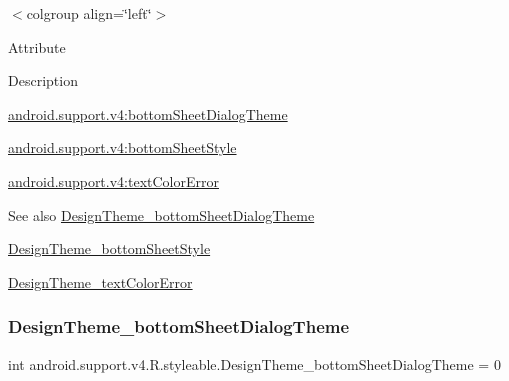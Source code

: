 \tabulinesep=1mm
\begin{longtabu} spread 0pt [c]{*{0}{|X[-1]}|}
\hline
\end{longtabu}
$<$colgroup align=\char`\"{}left\char`\"{}$>$ 

Attribute

Description 

{\ttfamily \hyperlink{classandroid_1_1support_1_1v4_1_1R_1_1styleable_a751b8940b6227f89ce627bab7a4782e0}{android.\+support.\+v4\+:bottom\+Sheet\+Dialog\+Theme}}

{\ttfamily \hyperlink{classandroid_1_1support_1_1v4_1_1R_1_1styleable_af97dd7c6ce7914e917496c10a232ef71}{android.\+support.\+v4\+:bottom\+Sheet\+Style}}

{\ttfamily \hyperlink{classandroid_1_1support_1_1v4_1_1R_1_1styleable_a6fcc0cb0fae8a6fc95519de5b4299973}{android.\+support.\+v4\+:text\+Color\+Error}}

\begin{DoxySeeAlso}{See also}
\hyperlink{classandroid_1_1support_1_1v4_1_1R_1_1styleable_a751b8940b6227f89ce627bab7a4782e0}{Design\+Theme\+\_\+bottom\+Sheet\+Dialog\+Theme} 

\hyperlink{classandroid_1_1support_1_1v4_1_1R_1_1styleable_af97dd7c6ce7914e917496c10a232ef71}{Design\+Theme\+\_\+bottom\+Sheet\+Style} 

\hyperlink{classandroid_1_1support_1_1v4_1_1R_1_1styleable_a6fcc0cb0fae8a6fc95519de5b4299973}{Design\+Theme\+\_\+text\+Color\+Error} 
\end{DoxySeeAlso}
\mbox{\label{classandroid_1_1support_1_1v4_1_1R_1_1styleable_a751b8940b6227f89ce627bab7a4782e0}} 
\subsubsection{\texorpdfstring{Design\+Theme\+\_\+bottom\+Sheet\+Dialog\+Theme}{DesignTheme\_bottomSheetDialogTheme}}
{\footnotesize\ttfamily int android.\+support.\+v4.\+R.\+styleable.\+Design\+Theme\+\_\+bottom\+Sheet\+Dialog\+Theme = 0\hspace{0.3cm}{\ttfamily [static]}}

